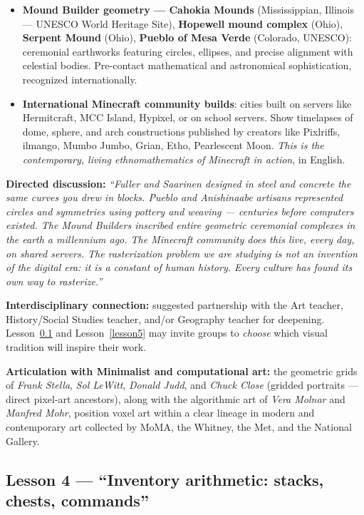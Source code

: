 \documentclass[12pt,a4paper]{scrartcl}
\newcommand{\acc}[1]{\textcolor{accent}{\textbf{#1}}}
\newcommand{\timetag}[1]{\textnormal{\footnotesize\color{bg!90!white}\textsf{#1}}}
\begin{document}
\begin{activity}[3.4 --- Dialogue with American visual heritage \quad\timetag{10 min}]
\begin{itemize}[leftmargin=1.3em,itemsep=0.2em,topsep=0.3em,nosep]
  \item \acc{Mound Builder geometry --- Cahokia Mounds} (Mississippian, Illinois --- UNESCO World Heritage Site), \acc{Hopewell mound complex} (Ohio), \acc{Serpent Mound} (Ohio), \acc{Pueblo of Mesa Verde} (Colorado, UNESCO): ceremonial earthworks featuring circles, ellipses, and precise alignment with celestial bodies. Pre-contact mathematical and astronomical sophistication, recognized internationally.

  \item \acc{International Minecraft community builds}: cities built on servers like Hermitcraft, MCC Island, Hypixel, or on school servers. Show timelapses of dome, sphere, and arch constructions published by creators like Pixlriffs, ilmango, Mumbo Jumbo, Grian, Etho, Pearlescent Moon. \emph{This is the contemporary, living ethnomathematics of Minecraft in action}, in English.
\end{itemize}

\textbf{Directed discussion:} \emph{\enquote{Fuller and Saarinen designed in steel and concrete the same curves you drew in blocks. Pueblo and Anishinaabe artisans represented circles and symmetries using pottery and weaving --- centuries before computers existed. The Mound Builders inscribed entire geometric ceremonial complexes in the earth a millennium ago. The Minecraft community does this live, every day, on shared servers. The rasterization problem we are studying is not an invention of the digital era: it is a constant of human history. Every culture has found its own way to \emph{rasterize}.}}

\textbf{Interdisciplinary connection:} suggested partnership with the Art teacher, History/Social Studies teacher, and/or Geography teacher for deepening. Lesson~\ref{lesson4} and Lesson~\ref{lesson5} may invite groups to \emph{choose} which visual tradition will inspire their work.

\textbf{Articulation with Minimalist and computational art:} the geometric grids of \emph{Frank Stella}, \emph{Sol LeWitt}, \emph{Donald Judd}, and \emph{Chuck Close} (gridded portraits --- direct pixel-art ancestors), along with the algorithmic art of \emph{Vera Molnar} and \emph{Manfred Mohr}, position voxel art within a clear lineage in modern and contemporary art collected by MoMA, the Whitney, the Met, and the National Gallery.
\end{activity}

\subsection{Lesson 4 --- \enquote{Inventory arithmetic: stacks, chests, commands}}\label{lesson4}
\end{document}
